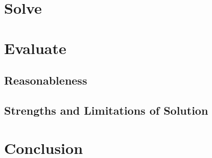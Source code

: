\documentclass[11pt, letterpaper]{article}
\begin{document}
\section{Solve}

\par 


\section{Evaluate}



\subsection{Reasonableness}


\subsection{Strengths and Limitations of Solution}


\section{Conclusion}


 
\end{document}
